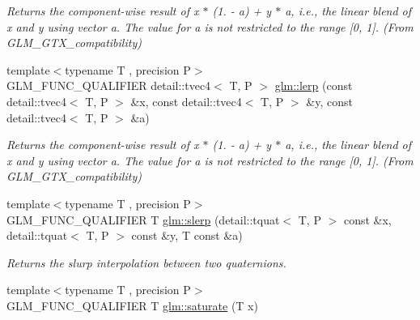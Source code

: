\begin{DoxyCompactItemize}
\begin{DoxyCompactList}\small\item\em Returns the component-\/wise result of x $\ast$ (1. -\/ a) + y $\ast$ a, i.\+e., the linear blend of x and y using vector a. The value for a is not restricted to the range \mbox{[}0, 1\mbox{]}. (From G\+L\+M\+\_\+\+G\+T\+X\+\_\+compatibility) \end{DoxyCompactList}\item 
{\footnotesize template$<$typename T , precision P$>$ }\\G\+L\+M\+\_\+\+F\+U\+N\+C\+\_\+\+Q\+U\+A\+L\+I\+F\+I\+ER detail\+::tvec4$<$ T, P $>$ \hyperlink{group__gtx__compatibility_ga48f60aeee275f1848cfc60a85fde96f2}{glm\+::lerp} (const detail\+::tvec4$<$ T, P $>$ \&x, const detail\+::tvec4$<$ T, P $>$ \&y, const detail\+::tvec4$<$ T, P $>$ \&a)\hypertarget{group__gtx__compatibility_ga48f60aeee275f1848cfc60a85fde96f2}{}\label{group__gtx__compatibility_ga48f60aeee275f1848cfc60a85fde96f2}

\begin{DoxyCompactList}\small\item\em Returns the component-\/wise result of x $\ast$ (1. -\/ a) + y $\ast$ a, i.\+e., the linear blend of x and y using vector a. The value for a is not restricted to the range \mbox{[}0, 1\mbox{]}. (From G\+L\+M\+\_\+\+G\+T\+X\+\_\+compatibility) \end{DoxyCompactList}\item 
{\footnotesize template$<$typename T , precision P$>$ }\\G\+L\+M\+\_\+\+F\+U\+N\+C\+\_\+\+Q\+U\+A\+L\+I\+F\+I\+ER T \hyperlink{group__gtx__compatibility_gaa47df8c302c9b42c813da3f658f90e1a}{glm\+::slerp} (detail\+::tquat$<$ T, P $>$ const \&x, detail\+::tquat$<$ T, P $>$ const \&y, T const \&a)
\begin{DoxyCompactList}\small\item\em Returns the slurp interpolation between two quaternions. \end{DoxyCompactList}\item 
{\footnotesize template$<$typename T , precision P$>$ }\\G\+L\+M\+\_\+\+F\+U\+N\+C\+\_\+\+Q\+U\+A\+L\+I\+F\+I\+ER T \hyperlink{group__gtx__compatibility_ga0fd09e616d122bc2ed9726682ffd44b7}{glm\+::saturate} (T x)\hypertarget{group__gtx__compatibility_ga0fd09e616d122bc2ed9726682ffd44b7}{}\label{group__gtx__compatibility_ga0fd09e616d122bc2ed9726682ffd44b7}


\end{DoxyCompactItemize}
